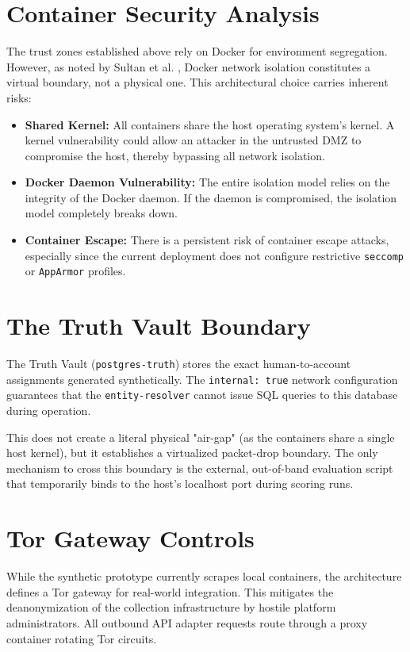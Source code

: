 \section{Container Security Analysis}
\label{sec:container-security}
The trust zones established above rely on Docker for environment segregation. However, as noted by Sultan et al. 
\cite{sultan2019container}, Docker network isolation constitutes a virtual boundary, not a physical one. 
This architectural choice carries inherent risks:

\begin{itemize}
    \item \textbf{Shared Kernel:} All containers share the host operating system's kernel. A kernel vulnerability 
          could allow an attacker in the untrusted DMZ to compromise the host, thereby bypassing all network isolation.
    \item \textbf{Docker Daemon Vulnerability:} The entire isolation model relies on the integrity of the Docker 
          daemon. If the daemon is compromised, the isolation model completely breaks down.
    \item \textbf{Container Escape:} There is a persistent risk of container escape attacks, especially since the 
          current deployment does not configure restrictive \texttt{seccomp} or \texttt{AppArmor} profiles.
\end{itemize}

\section{The Truth Vault Boundary}
\label{sec:sec-truth-vault}
The Truth Vault (\texttt{postgres-truth}) stores the exact human-to-account assignments generated synthetically. 
The \texttt{internal: true} network configuration guarantees that the \texttt{entity-resolver} cannot issue SQL queries 
to this database during operation. 

This does not create a literal physical "air-gap" (as the containers share a single host kernel), but it establishes a 
virtualized packet-drop boundary. The only mechanism to cross this boundary is the external, out-of-band evaluation 
script that temporarily binds to the host's localhost port during scoring runs.

\section{Tor Gateway Controls}
\label{sec:sec-tor-gateway}
While the synthetic prototype currently scrapes local containers, the architecture defines a Tor gateway for real-world 
integration. This mitigates the deanonymization of the collection infrastructure by hostile platform administrators. 
All outbound API adapter requests route through a proxy container rotating Tor circuits.

